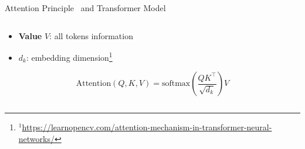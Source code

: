 \documentclass[11pt,aspectratio=169]{beamer}
\begin{document}
\begin{frame}{Attention Principle~\cite{Bahdanau2014NeuralMT} and Transformer Model~\cite{DBLP:journals/corr/VaswaniSPUJGKP17}}
\begin{columns}
\begin{column}{0.55\linewidth}
\begin{itemize}
                \item \textbf{Value} $V$: all tokens information
                \item $d_k$: embedding dimension\footnote{$^1$\url{https://learnopencv.com/attention-mechanism-in-transformer-neural-networks/}}
            \end{itemize}
            \vspace{0.3cm}
            \begin{equation*}
                \text{Attention}(Q, K, V) = \text{softmax}\left(\frac{QK^\top}{\sqrt{d_k}}\right)V
            \end{equation*}
            \vspace{1cm}
        \end{column}
    \end{columns}
\end{frame}
\end{document}
